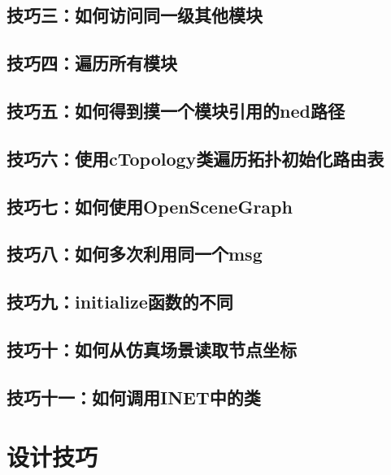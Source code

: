 \subsection{技巧三：如何访问同一级其他模块}
\subsection{技巧四：遍历所有模块}
\subsection{技巧五：如何得到摸一个模块引用的ned路径}

\subsection{技巧六：使用cTopology类遍历拓扑初始化路由表}

\subsection{技巧七：如何使用OpenSceneGraph}
\subsection{技巧八：如何多次利用同一个msg}

\subsection{技巧九：initialize函数的不同}
\subsection{技巧十：如何从仿真场景读取节点坐标}
\subsection{技巧十一：如何调用INET中的类}

\section{设计技巧}






